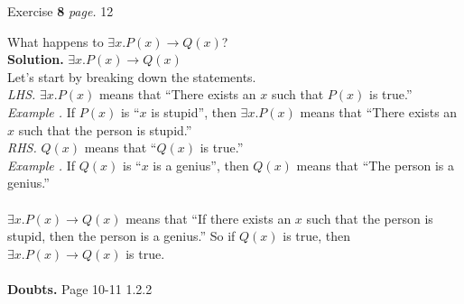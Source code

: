 \documentclass[11pt]{article}
\newcommand{\problem
}[2]{
\begin{mdframed}
    Exercise \textbf{#1} \hfill \emph{page. }#2
\end{mdframed}
}
\begin{document}
\problem{8}{12}
What happens to $\exists x.P(x) \rightarrow Q(x)$?\\
\textbf{Solution. }
$\exists x.P(x) \rightarrow Q(x)$\\
Let's start by breaking down the statements.\\
\emph{LHS. } $\exists x.P(x)$ means that ``There exists an $x$ such that $P(x)$ is true.'' \\ \emph{Example .} If $P(x)$ is ``$x$ is stupid'', then $\exists x.P(x)$ means that ``There exists an $x$ such that the person is stupid.''\bigskip
\\
\noindent \emph{RHS. } $Q(x)$ means that ``$Q(x)$ is true.''\\ \emph{Example .} If $Q(x)$ is ``$x$ is a genius'', then $Q(x)$ means that ``The person is a genius.''\\
\\
$\exists x.P(x) \rightarrow Q(x)$ means that ``If there exists an $x$ such that the person is stupid, then the person is a genius.'' So if $Q(x)$ is true, then $\exists x.P(x) \rightarrow Q(x)$ is true.\\
\vspace{40pt}
\\
\noindent \textbf{Doubts. } Page 10-11 1.2.2
\end{document}
